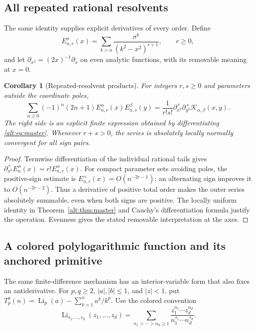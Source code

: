 \documentclass[11pt]{article}
\newtheorem{corollary}[theorem]{Corollary}
\theoremstyle{definition}
\theoremstyle{remark}
\numberwithin{equation}{section}
\begin{document}
\subsection{All repeated rational resolvents}

The same identity supplies explicit derivatives of every order. Define
\[
 E_{n,r}^{\sigma}(x)=\sum_{k>n}
       \frac{\sigma^k}{(k^2-x^2)^{r+1}},\qquad r\ge0,
\]
and let $\partial_{x^2}=(2x)^{-1}\partial_x$ on even analytic
functions, with its removable meaning at $x=0$.

\begin{corollary}[Repeated-resolvent products]\label{alt:cor:derivatives}
For integers $r,s\ge0$ and parameters outside the coordinate poles,
\begin{equation}\label{alt:eq:derivatives}
 \sum_{n\ge0}(-1)^n(2n+1)
        E_{n,r}^{\alpha}(x)E_{n,s}^{\beta}(y)
 =\frac{1}{r!s!}
      \partial_{x^2}^{\,r}\partial_{y^2}^{\,s}
                         \mathcal K_{\alpha,\beta}(x,y).
\end{equation}
The right side is an explicit finite expression obtained by
differentiating \eqref{alt:eq:master}. Whenever $r+s>0$, the series
is absolutely locally normally convergent for all sign pairs.
\end{corollary}
\begin{proof}
Termwise differentiation of the individual rational tails gives
$\partial_{x^2}^{\,r}E_n^\alpha(x)=r!E_{n,r}^\alpha(x)$.
For compact parameter sets avoiding poles, the positive-sign estimate
is $E_{n,r}^+(x)=O(n^{-2r-1})$; an alternating sign improves it to
$O(n^{-2r-2})$. Thus a derivative of positive total order makes the
outer series absolutely summable, even when both signs are positive.
The locally uniform identity in Theorem~\ref{alt:thm:master} and
Cauchy's differentiation formula justify the operation. Evenness
gives the stated removable interpretation at the axes.
\end{proof}

\subsection{A colored polylogarithmic function and its anchored primitive}

The same finite-difference mechanism has an interior-variable form that
also fixes an antiderivative. For $p,q\ge2$, $|a|,|b|\le1$, and
$|z|<1$, put
$T_p^a(n)=\operatorname{Li}_p(a)-\sum_{k=1}^n a^k/k^p$.
Use the colored convention
\[
 \operatorname{Li}_{s_1,\ldots,s_d}(z_1,\ldots,z_d)
 =\sum_{n_1>\cdots>n_d\ge1}
       \frac{z_1^{n_1}\cdots z_d^{n_d}}
            {n_1^{s_1}\cdots n_d^{s_d}}.
\]
\end{document}
